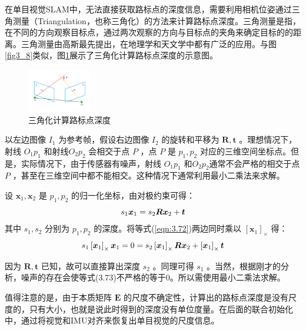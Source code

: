 在单目视觉SLAM中，无法直接获取路标点的深度信息，需要利用相机位姿通过三角测量（Triangulation，也称三角化）的方法来计算路标点深度。三角测量是指，在不同的方向观察目标点，通过两次观察的方向与目标点的夹角来确定目标的的距离。三角测量由高斯最先提出，在地理学和天文学中都有广泛的应用。与图\ref{fig3_8}类似，图\ref{fig3_10}展示了三角化计算路标点深度的示意图。
\begin{figure}[h]\setlength{\belowcaptionskip}{-12pt}
	\centering
	\includegraphics[width=0.25\textwidth, angle=-90]{figures/chapter3/fig3_10}
	\caption{三角化计算路标点深度}\label{fig3_10}
\end{figure}

以左边图像 $I_1 $ 为参考帧，假设右边图像  $I_2 $ 的旋转和平移为 $\boldsymbol{R}, \boldsymbol{t} $ 。理想情况下，射线 $O_1p_1 $ 和射线$O_2p_2 $ 会相交于点 $P$ ，点 $P$ 是 $p_1,p_2 $ 对应的三维空间坐标点。但是，实际情况下，由于传感器有噪声，射线 $O_1p_1 $ 和$O_2p_2 $通常不会严格的相交于点 $P$ ，甚至在三维空间中都不能相交。这种情况下通常利用最小二乘法来求解。

设 $\boldsymbol{x}_{1}, \boldsymbol{x}_{2} $ 是 $p_1,p_2 $ 的归一化坐标，由对极约束可得：
\begin{equation}
\label{eqn:3.72}
\setlength{\abovedisplayskip}{6pt}
\setlength{\belowdisplayskip}{6pt}
s_{1} \boldsymbol{x}_{1}=s_{2} \boldsymbol{R} \boldsymbol{x}_{2}+\boldsymbol{t}
\end{equation}
其中 $s_{1}, s_{2} $ 分别为 $p_1,p_2 $ 的深度。将等式(\ref{eqn:3.72})两边同时乘以 $\left[ \bm{x}_1 \right]_\times$ 得：
\begin{equation}
\label{eqn:3.73}
\setlength{\abovedisplayskip}{6pt}
\setlength{\belowdisplayskip}{6pt}
s_{1} \left[\boldsymbol{x}_{1}\right]_\times \boldsymbol{x}_{1}=0=s_{2} \left[\boldsymbol{x}_{1}\right]_\times \boldsymbol{R} \boldsymbol{x}_{2}+ \left[\boldsymbol{x}_{1}\right]_\times \boldsymbol{t}
\end{equation}

因为 $\boldsymbol{R}, \boldsymbol{t} $ 已知，故可以直接算出深度 $s_2 $ 。同理可得 $s_1 $ 。当然，根据刚才的分析，噪声的存在会使等式(3.73)不严格的等于0。所以需使用最小二乘法求解。

值得注意的是，由于本质矩阵 $\bm{E} $ 的尺度不确定性，计算出的路标点深度是没有尺度的，只有大小，也就是说此时得到的深度没有单位度量。在后面的联合初始化中，通过将视觉和IMU对齐来恢复出单目视觉的尺度信息。

